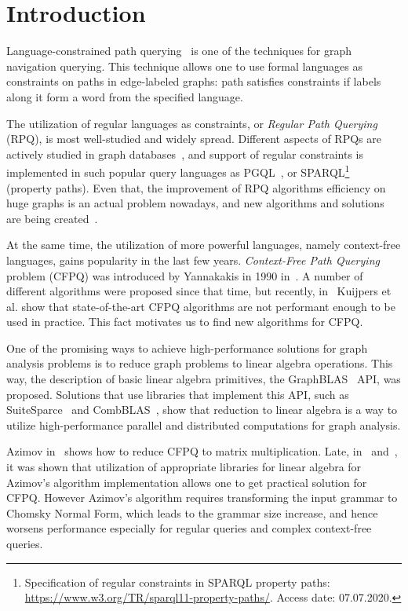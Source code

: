 \section{Introduction}


Language-constrained path querying~\cite{barrett2000formal} is one of the techniques for graph navigation querying.
This technique allows one to use formal languages as constraints on paths in edge-labeled graphs: path satisfies constraints if labels along it form a word from the specified language.

The utilization of regular languages as constraints, or \textit{Regular Path Querying} (RPQ), is most well-studied and widely spread.
Different aspects of RPQs are actively studied in graph databases~\cite{10.1145/2463664.2465216, 10.1145/3104031,10.1145/2850413}, and support of regular constraints is implemented in such popular query languages as PGQL~\cite{10.1145/2960414.2960421}, or SPARQL\footnote{Specification of regular constraints in SPARQL property paths: \url{https://www.w3.org/TR/sparql11-property-paths/}. Access date: 07.07.2020.}~\cite{10.1007/978-3-319-25007-6_1} (property paths).
Even that, the improvement of RPQ algorithms efficiency on huge graphs is an actual problem nowadays, and new algorithms and solutions are being created~\cite{Wang2019,10.1145/2949689.2949711}.

At the same time, the utilization of more powerful languages, namely context-free languages, gains popularity in the last few years. 
\textit{Context-Free Path Querying} problem (CFPQ) was introduced by Yannakakis in 1990 in~\cite{Yannakakis}.
A number of different algorithms were proposed since that time, but recently, in~\cite{Kuijpers:2019:ESC:3335783.3335791} Kuijpers et al. show that state-of-the-art CFPQ algorithms are not performant enough to be used in practice.
This fact motivates us to find new algorithms for CFPQ.

One of the promising ways to achieve high-performance solutions for graph analysis problems is to reduce graph problems to linear algebra operations.
This way, the description of basic linear algebra primitives, the GraphBLAS~\cite{7761646} API, was proposed.
Solutions that use libraries that implement this API, such as SuiteSparce~\cite{10.1145/3322125} and CombBLAS~\cite{10.1177/1094342011403516}, show that reduction to linear algebra is a way to utilize high-performance parallel and distributed computations for graph analysis.

Azimov in~\cite{Azimov:2018:CPQ:3210259.3210264} shows how to reduce CFPQ to matrix multiplication.
Late, in~\cite{Mishin:2019:ECP:3327964.3328503} and~\cite{10.1145/3398682.3399163}, it was shown that utilization of appropriate libraries for linear algebra for Azimov's algorithm implementation allows one to get practical solution for CFPQ.
However Azimov's algorithm requires transforming the input grammar to Chomsky Normal Form, which leads to the grammar size increase, and hence worsens performance especially for regular queries and complex context-free queries.

